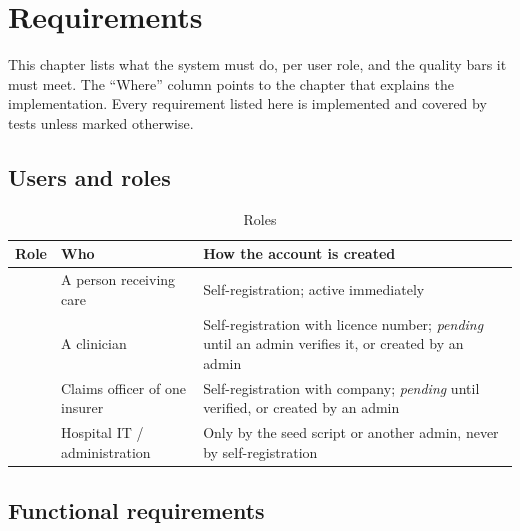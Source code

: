 \chapter{Requirements}\label{ch:requirements}

This chapter lists what the system must do, per user role, and the quality bars
it must meet. The ``Where'' column points to the chapter that explains the
implementation. Every requirement listed here is implemented and covered by
tests unless marked otherwise.

\section{Users and roles}

\begin{table}[H]
\centering\small
\caption{Roles}\label{tab:roles}
\begin{tabularx}{\textwidth}{@{}P{2.6cm}YP{4.2cm}@{}}
\toprule
\textbf{Role} & \textbf{Who} & \textbf{How the account is created} \\
\midrule
{} & A person receiving care & Self-registration; active immediately \\
 & A clinician & Self-registration with licence number; \emph{pending} until an admin verifies it, or created by an admin \\
 & Claims officer of one insurer & Self-registration with company; \emph{pending} until verified, or created by an admin \\
 & Hospital IT / administration & Only by the seed script or another admin, never by self-registration \\
\bottomrule
\end{tabularx}
\end{table}

\section{Functional requirements}

